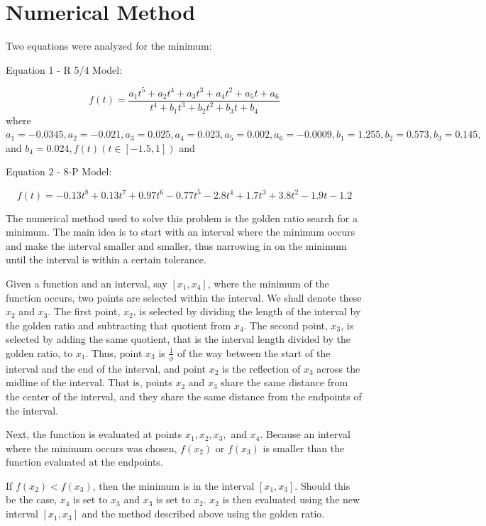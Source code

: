 \documentclass[linenumbers,RNAAS,trackchanges]{aastex631}
\begin{document}
\section{Numerical Method} \label{sec:method}
Two equations were analyzed for the minimum: 
\\\begin{center}Equation 1 - R 5/4 Model:\end{center}
$$f(t) = \frac{a_1t^5 + a_2t^4 + a_3t^3 + a_4t^2 + a_5t + a_6}{t^4 + b_1t^3 + b_2t^2 + b_3t + b_4}$$ 
where $a_1 = -0.0345, a_2 = -0.021, a_3 = 0.025, a_4 = 0.023, a_5 = 0.002, a_6 = -0.0009, b_1 = 1.255, b_2 = 0.573, b_3 = 0.145,$ and $b_4 = 0.024, f(t)(t \in [-1.5,1])$ and
\\\begin{center}Equation 2 - 8-P Model:\end{center}
$$f(t) = -0.13t^8 + 0.13t^7 + 0.97t^6 - 0.77t^5 - 2.8t^4 + 1.7t^3 + 3.8t^2 - 1.9t - 1.2$$

The numerical method used to solve this problem is the golden ratio search for a minimum. The main idea is to start with an interval where the minimum occurs and make the interval smaller and smaller, thus narrowing in on the minimum until the interval is within a certain tolerance. 

Given a function and an interval, say $[x_1,x_4]$, where the minimum of the function occurs, two points are selected within the interval. We shall denote these $x_2$ and $x_3$. The first point, $x_2$, is selected by dividing the length of the interval by the golden ratio and subtracting that quotient from $x_4$. The second point, $x_3$, is selected by adding the same quotient, that is the interval length divided by the golden ratio, to $x_1$. Thus, point $x_3$ is $\displaystyle\frac{1}{\phi}$ of the way between the start of the interval and the end of the interval, and point $x_2$ is the reflection of $x_3$ across the midline of the interval. That is, points $x_2$ and $x_3$ share the same distance from the center of the interval, and they share the same distance from the endpoints of the interval. 

Next, the function is evaluated at points $x_1, x_2, x_3,$ and $x_4$. Because an interval where the minimum occurs was chosen, $f(x_2)$ or $f(x_3)$ is smaller than the function evaluated at the endpoints. 

If $f(x_2) < f(x_3)$, then the minimum is in the interval $[x_1, x_3]$. Should this be the case, $x_4$ is set to $x_3$ and $x_3$ is set to $x_2$. $x_2$ is then evaluated using the new interval $[x_1, x_3]$ and the method described above using the golden ratio. 
\end{document}
